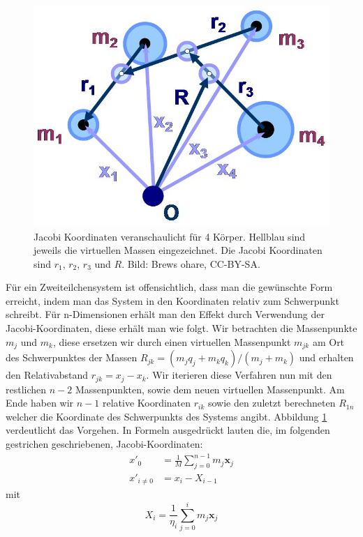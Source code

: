 \documentclass[12pt,a4paper,twoside]{article}
\renewcommand{\vec}{\mathbf}
\begin{document}
\begin{figure}[tbn]
\centering
\includegraphics[scale=0.5]{img/Four-body_Jacobi_coordinates} %
\caption{Jacobi Koordinaten veranschaulicht für 4 Körper. Hellblau sind jeweils die virtuellen Massen eingezeichnet. Die Jacobi Koordinaten sind $r_1$, $r_2$, $r_3$ und $R$. Bild: Brews ohare, CC-BY-SA.}
\label{fig:Jacobi}
\end{figure}
Für ein Zweiteilchensystem ist offensichtlich, dass man die gewünschte Form erreicht, indem man das System in den Koordinaten relativ zum Schwerpunkt schreibt. Für n-Dimensionen erhält man den Effekt durch Verwendung der Jacobi-Koordinaten, diese erhält man wie folgt.
Wir betrachten die Massenpunkte $m_j$ und $m_k$, diese ersetzen wir durch einen virtuellen Massenpunkt $m_{jk}$ am Ort des Schwerpunktes der Massen $R_{jk} = (m_j q_j + m_k q_k)/(m_j + m_k)$ und erhalten den Relativabstand $r_{jk} = x_j - x_k $.
Wir iterieren diese Verfahren nun mit den restlichen $n-2$ Massenpunkten, sowie dem neuen virtuellen Massenpunkt. Am Ende haben wir $n-1$ relative Koordinaten $r_{ik}$ sowie den zuletzt berechneten $R_{1n}$ welcher die Koordinate des Schwerpunkts des Systems angibt.
Abbildung \ref{fig:Jacobi} verdeutlicht das Vorgehen.
In Formeln ausgedrückt lauten die, im folgenden gestrichen geschriebenen, Jacobi-Koordinaten:
\begin{align}
x'_0 &= \frac{1}{M} \sum\limits_{j=0}^{n-1} m_j\vec{x}_j \\
x'_{i\neq0} &= x_i - X_{i-1}
\end{align}
mit
\begin{equation}
X_i = \frac{1}{\eta_i} \sum\limits_{j=0}^{i} m_j\vec{x}_j
\end{equation}
\end{document}
